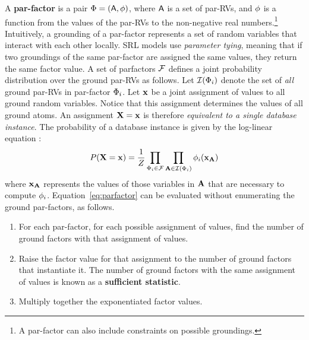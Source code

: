 A \textbf{par-factor} is a pair $\Phi = (\mathsf{A},\phi)$, where $\mathsf{A}$ is a set of par-RVs, and $\phi$ is a function from the values of the par-RVs to the non-negative real numbers.\footnote{A par-factor can also include constraints on possible groundings.} Intuitively, a grounding of a par-factor represents a set of random variables that interact with each other locally. SRL models use {\em parameter tying}, meaning that if two groundings of the same par-factor are assigned the same values, they return the same factor value. A set of parfactors $\mathcal{F}$ defines a joint probability distribution over the ground par-RVs as follows. Let $\mathcal{I}(\Phi_{i})$ denote the set of {\em all} ground par-RVs in par-factor $\Phi_{i}$. Let $\mathbf{x}$ be a joint assignment of values to all ground random variables. Notice that this assignment determines the values of all ground atoms. An assignment $\mathbf{X}=\mathbf{x}$ is therefore {\em equivalent to a single database instance}.
The probability of a database instance is given by the log-linear equation \cite[Eq.7]{Kimmig2015}:
\begin{equation} \label{eq:parfactor}
P(\mathbf{X}=\mathbf{x}) = \frac{1}{Z} \prod_{\Phi_{i} \in \mathcal{F}} \prod_{\mathbf{A} \in \mathcal{I}(\Phi_{i})} 
\phi_{i}(\mathbf{x}_{\mathbf{A}}) 
\end{equation}
where $\mathbf{x}_{\mathbf{A}}$ represents the values of those variables in $\mathbf{A}$ that are necessary to compute $\phi_{i}$. 
Equation~\ref{eq:parfactor} can be evaluated without enumerating the ground par-factors, 
as follows. 
%
%

\begin{enumerate}
\item For each par-factor, for each possible assignment of values, find the number of ground factors with that assignment of values. 
\item Raise the factor value for that assignment to the number of ground factors that instantiate it. The number of ground factors with the same assignment of values is known as a \textbf{sufficient statistic}.
\item Multiply together the exponentiated factor values.  
\end{enumerate}

